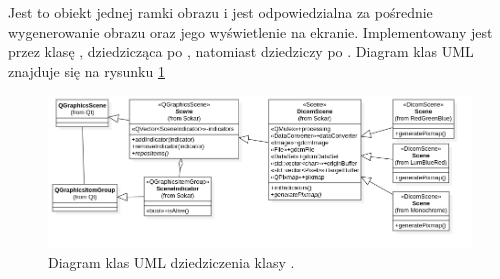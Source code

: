 \label{sec:sokar-dicomscene}

Jest to obiekt jednej ramki obrazu i jest odpowiedzialna za pośrednie wygenerowanie obrazu oraz jego wyświetlenie na ekranie.
Implementowany jest przez klasę , dziedzicząca po , natomiast  dziedziczy po .
Diagram klas UML znajduje się na rysunku \ref{uml:sokar-dicomscene}

\begin{figure}[!htbp]
    \centering
    \includegraphics[width=\textwidth]{img/uml/dicom-scene.png}
    \caption{Diagram klas UML dziedziczenia klasy .}
    \label{uml:sokar-dicomscene}
\end{figure}

